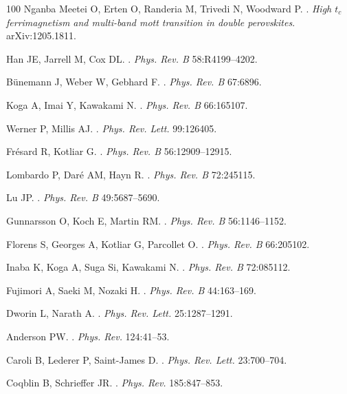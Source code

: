 \documentclass[]{ar2e-changed}%
\begin{document}
\begin{thebibliography}{100}
{Nganba Meetei} O, {Erten} O, {Randeria} M, {Trivedi} N, {Woodward} P.
.
\newblock \emph{High $t_c$ ferrimagnetism and multi-band mott transition in
  double perovskites}.
\newblock arXiv:1205.1811.

Han JE, Jarrell M, Cox DL.
.
\newblock \emph{Phys. Rev. B} 58:R4199--4202.

B\"{u}nemann J, Weber W, Gebhard F.
.
\newblock \emph{Phys. Rev. B} 67:6896.

Koga A, Imai Y, Kawakami N.
.
\newblock \emph{Phys. Rev. B} 66:165107.

Werner P, Millis AJ.
.
\newblock \emph{Phys. Rev. Lett.} 99:126405.

Fr\'esard R, Kotliar G.
.
\newblock \emph{Phys. Rev. B} 56:12909--12915.

Lombardo P, Dar\'e AM, Hayn R.
.
\newblock \emph{Phys. Rev. B} 72:245115.

Lu JP.
.
\newblock \emph{Phys. Rev. B} 49:5687--5690.

{Gunnarsson} O, {Koch} E, {Martin} RM.
.
\newblock \emph{Phys. Rev. B} 56:1146--1152.

{Florens} S, {Georges} A, {Kotliar} G, {Parcollet} O.
.
\newblock \emph{Phys. Rev. B} 66:205102.

Inaba K, Koga A, Suga Si, Kawakami N.
.
\newblock \emph{Phys. Rev. B} 72:085112.

Fujimori A, Saeki M, Nozaki H.
.
\newblock \emph{Phys. Rev. B} 44:163--169.

Dworin L, Narath A.
.
\newblock \emph{Phys. Rev. Lett.} 25:1287--1291.

Anderson PW.
.
\newblock \emph{Phys. Rev.} 124:41--53.

Caroli B, Lederer P, Saint-James D.
.
\newblock \emph{Phys. Rev. Lett.} 23:700--704.

Coqblin B, Schrieffer JR.
.
\newblock \emph{Phys. Rev.} 185:847--853.


\end{thebibliography}
\end{document}
